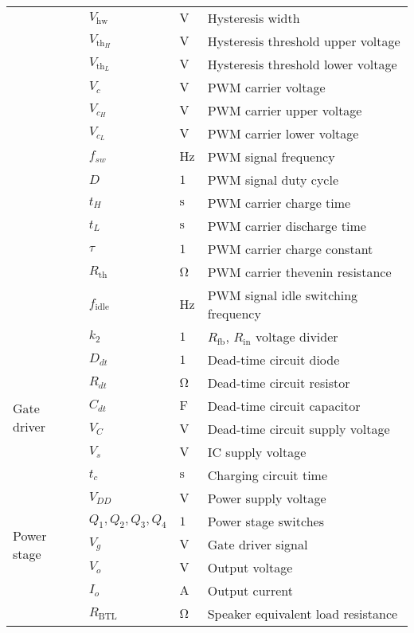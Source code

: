 \begin{longtable}{@{}llll@{}}
	& $V_{\mathrm{hw}}$ & $\si{\volt}$ & Hysteresis width \\
	& $V_{\mathrm{th}_{H}}$ & $\si{\volt}$ & Hysteresis threshold upper voltage \\
	& $V_{\mathrm{th}_{L}}$ & $\si{\volt}$ & Hysteresis threshold lower voltage \\
	& $V_{c}$ & $\si{\volt}$ & PWM carrier voltage \\
	& $V_{c_{H}}$ & $\si{\volt}$ & PWM carrier upper voltage \\
	& $V_{c_{L}}$ & $\si{\volt}$ & PWM carrier lower voltage \\
	& $f_{sw}$ & $\si{\hertz}$ & PWM signal frequency \\
	& $D$ & $1$ & PWM signal duty cycle \\
	& $t_{H}$ & $\si{\second}$ & PWM carrier charge time \\
	& $t_{L}$ & $\si{\second}$ & PWM carrier discharge time \\
	& $\tau$ & $1$ & PWM carrier charge constant \\
	& $R_{\mathrm{th}}$ & $\si{\ohm}$ & PWM carrier thevenin resistance \\
	& $f_{\mathrm{idle}}$ & $\si{\hertz}$ & PWM signal idle switching frequency \\
	& $k_{2}$ & $1$ & $R_{\mathrm{fb}}$, $R_{\mathrm{in}}$ voltage divider \\ \midrule
	\multirow{6}{*}{Gate driver}  & $D_{dt}$ & $1$ & Dead-time circuit diode \\
	& $R_{dt}$ & $\si{\ohm}$ & Dead-time circuit resistor \\
	& $C_{dt}$ & $\si{\farad}$ & Dead-time circuit capacitor \\
	& $V_{C}$ & $\si{\volt}$ & Dead-time circuit supply voltage \\
	& $V_{s}$ & $\si{\volt}$ & IC supply voltage \\
	& $t_{c}$ & $\si{\second}$ & Charging circuit time \\ \midrule
	\multirow{5}{*}{Power stage}  & $V_{DD}$ & $\si{\volt}$ & Power supply voltage \\
	& $Q_{1}, Q_{2}, Q_{3}, Q_{4}$ & $1$ & Power stage switches \\
	& $V_{g}$ & $\si{\volt}$ & Gate driver signal \\
	& $V_{o}$ & $\si{\volt}$ & Output voltage \\
	& $I_{o}$ & $\si{\ampere}$ & Output current \\
	& $R_{\mathrm{BTL}}$ & $\si{\ohm}$ & Speaker equivalent load resistance \\ \midrule

\end{longtable}
